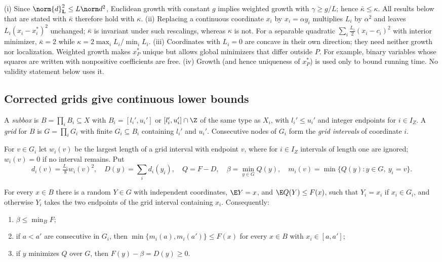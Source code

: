 \begin{remark}\label{core:rem:kappa}
(i) Since $\norm{d}_{\mathbf L}^2\le L\norm d^2$, Euclidean growth with
constant $g$ implies weighted growth with $\gamma\ge g/L$; hence
$\bar\kappa\le\kappa$. All results below that are stated with $\bar\kappa$
therefore hold with $\kappa$.
(ii) Replacing a continuous coordinate $x_i$ by $x_i=\alpha y_i$ multiplies
$L_i$ by $\alpha^2$ and leaves $L_i(x_i-x_i^*)^2$ unchanged; $\bar\kappa$ is
invariant under such rescalings, whereas $\kappa$ is not. For a separable
quadratic $\sum_i\frac{L_i}2(x_i-c_i)^2$ with interior minimizer,
$\bar\kappa=2$ while $\kappa=2\max_iL_i/\min_iL_i$.
(iii) Coordinates with $L_i=0$ are concave in their own direction; they need
neither growth nor localization. Weighted growth makes $x^*_P$ unique but
allows global minimizers that differ outside $P$. For example, binary
variables whose squares are written with nonpositive coefficients are free.
(iv) Growth (and hence uniqueness of $x^*_P$) is used only to bound running
time. No validity statement below uses it.
\end{remark}

\subsection{Corrected grids give continuous lower bounds}\label{core:sec:grid}

A \emph{subbox} is $B=\prod_iB_i\subseteq X$ with $B_i=[l_i',u_i']$ or
$[l_i',u_i']\cap\Z$ of the same type as $X_i$, with $l_i'\le u_i'$ and
integer endpoints for $i\in I_Z$. A \emph{grid} for $B$ is $G=\prod_iG_i$ with
finite $G_i\subseteq B_i$ containing $l_i'$ and $u_i'$. Consecutive nodes of
$G_i$ form the \emph{grid intervals} of coordinate $i$.

\begin{definition}[Corrections]\label{core:def:corr}
For $v\in G_i$ let $w_i(v)$ be the largest length of a grid interval with
endpoint $v$, where for $i\in I_Z$ intervals of length one are ignored;
$w_i(v)=0$ if no interval remains. Put
\[
d_i(v)=\tfrac{L_i}{8}w_i(v)^2,\quad D(y)=\sum_id_i(y_i),\quad Q=F-D,\quad
\beta=\min_{y\in G}Q(y),\quad
m_i(v)=\min\{Q(y):y\in G,\ y_i=v\}.
\]
\end{definition}

\begin{lemma}[Interpolation]\label{core:lem:interp}
For every $x\in B$ there is a random $Y\in G$ with independent coordinates,
$\E Y=x$, and $\E Q(Y)\le F(x)$, such that $Y_i=x_i$ if $x_i\in G_i$, and
otherwise $Y_i$ takes the two endpoints of the grid interval containing
$x_i$. Consequently:
\begin{enumerate}
\item[(a)] $\beta\le\min_BF$;
\item[(b)] if $a<a'$ are consecutive in $G_i$, then
$\min\{m_i(a),m_i(a')\}\le F(x)$ for every $x\in B$ with $x_i\in[a,a']$;
\item[(c)] if $y$ minimizes $Q$ over $G$, then $F(y)-\beta=D(y)\ge0$.
\end{enumerate}
\end{lemma}

